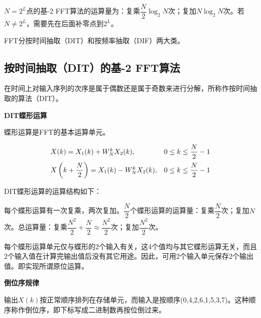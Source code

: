 \documentclass[cn, hazy, blue, normal, 12pt]{elegantnote}
\begin{document}
$N=2^L$点的基-2 FFT算法的运算量为：复乘$\dfrac{N}{2}\log_2 N$次；复加$N\log_2 N$次。若$N\neq2^L$，需要先在后面补零点到$2^L$。

FFT分按时间抽取（DIT）和按频率抽取（DIF）两大类。


\subsection{按时间抽取（DIT）的基-2 FFT算法}

在时间上对输入序列的次序是属于偶数还是属于奇数来进行分解，所称作按时间抽取的算法（DIT）。

\textbf{DIT蝶形运算}

蝶形运算是FFT的基本运算单元。

\begin{equation}
\begin{array}{ll}
    X(k)=X_1(k)+W_N^k X_2(k), & 0\leq k\leq \dfrac{N}{2}-1 \\
    \addlinespace
    X\left(k+\dfrac{N}{2}\right)=X_1(k)-W_N^k X_2(k), & 0\leq k\leq \dfrac{N}{2}-1
\end{array}
\end{equation}

DIT蝶形运算的运算结构如下：

\begin{center}
\end{center}

每个蝶形运算有一次复乘，两次复加。$\dfrac{N}{2}$个蝶形运算的运算量：复乘$\dfrac{N}{2}$次；复加$N$次。总运算量：复乘$\dfrac{N^2}{2}+\dfrac{N}{2}\approx \dfrac{N^2}{2}$次；复加$\dfrac{N^2}{2}$次。

每个蝶形运算单元仅与蝶形的2个输入有关，这4个值均与其它蝶形运算无关，而且2个输入值在计算完输出值后没有其它用途。因此，可用2个输入单元保存2个输出值。即实现所谓原位运算。

\textbf{倒位序规律}

输出$X(k)$按正常顺序排列在存储单元，而输入是按顺序(0,4,2,6,1,5,3,7)。这种顺序称作倒位序，即下标写成二进制数再按位倒过来。
\end{document}
